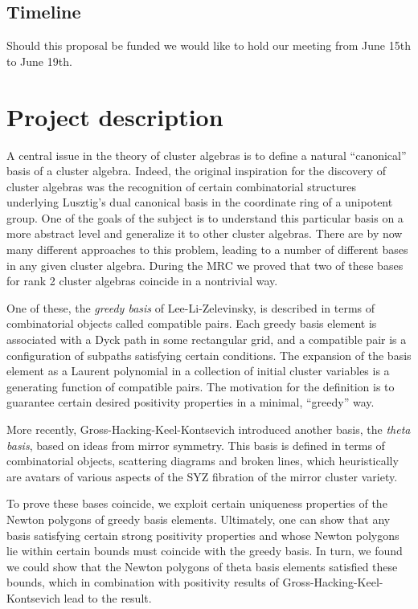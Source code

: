 \documentclass{amsart}
\begin{document}
  \subsection*{Timeline} 
    Should this proposal be funded we would like to hold our meeting from June
    15th to June 19th.

  \section*{Project description}

    A central issue in the theory of cluster algebras is to define a natural
    ``canonical'' basis of a cluster algebra.
    Indeed, the original inspiration for the discovery of cluster algebras was
    the recognition of certain combinatorial structures underlying Lusztig's
    dual canonical basis in the coordinate ring of a unipotent group.
    One of the goals of the subject is to understand this particular basis on a
    more abstract level and generalize it to other cluster algebras.
    There are by now many different approaches to this problem, leading to a
    number of different bases in any given cluster algebra.
    During the MRC we proved that two of these bases for rank 2 cluster algebras
    coincide in a nontrivial way.

    One of these, the \emph{greedy basis} of Lee-Li-Zelevinsky, is described in
    terms of combinatorial objects called compatible pairs.
    Each greedy basis element is associated with a Dyck path in some rectangular
    grid, and a compatible pair is a configuration of subpaths satisfying
    certain conditions.
    The expansion of the basis element as a Laurent polynomial in a collection
    of initial cluster variables is a generating function of compatible pairs.
    The motivation for the definition is to guarantee certain desired positivity
    properties in a minimal, ``greedy'' way.

    More recently, Gross-Hacking-Keel-Kontsevich introduced another basis, the
    \emph{theta basis}, based on ideas from mirror symmetry.
    This basis is defined in terms of combinatorial objects, scattering diagrams
    and broken lines, which heuristically are avatars of various aspects of the
    SYZ fibration of the mirror cluster variety.
    
    To prove these bases coincide, we exploit certain uniqueness properties of
    the Newton polygons of greedy basis elements.
    Ultimately, one can show that any basis satisfying certain strong positivity
    properties and whose Newton polygons lie within certain bounds must coincide
    with the greedy basis.
    In turn, we found we could show that the Newton polygons of theta basis
    elements satisfied these bounds, which in combination with positivity
    results of Gross-Hacking-Keel-Kontsevich lead to the result.
    
\end{document}
